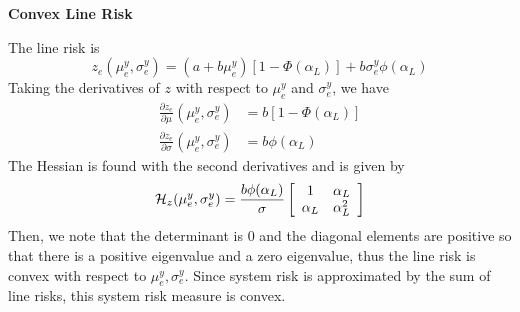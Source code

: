 \textbf{Convex Line Risk}

The line risk is
\begin{equation}
z_e(\mu^y_e,\sigma^y_e) = (a + b \mu^y_e)\left[ 1 - \Phi(\alpha_L) \right]  + b \sigma^y_e \phi(\alpha_L) 
\end{equation}
Taking the derivatives of $z$ with respect to $\mu^y_e$ and $\sigma^y_e$, we have
\begin{align*}
\frac{\partial z_e}{\partial \mu}(\mu^y_e,\sigma^y_e) & = b\left[ 1 - \Phi(\alpha_L) \right]\\
\frac{\partial z_e}{\partial \sigma}(\mu^y_e,\sigma^y_e) & = b \phi(\alpha_L) 
\end{align*} 
The Hessian is found with the second derivatives and is given by
\begin{equation}
\mathcal{H}_z(\mu^y_e,\sigma^y_e) = \frac{b \phi(\alpha_L)}{\sigma}
\left[ 
\begin{array}{c c}
1 & \alpha_L \\
\alpha_L & \alpha_L^2
\end{array}
\right]
\end{equation}
Then, we note that the determinant is 0 and the diagonal elements are positive so that there is a positive eigenvalue and a zero eigenvalue, thus the line risk is convex with respect to $\mu^y_e, \sigma^y_e$.  Since system risk is approximated by the sum of line risks, this system risk measure is convex.
